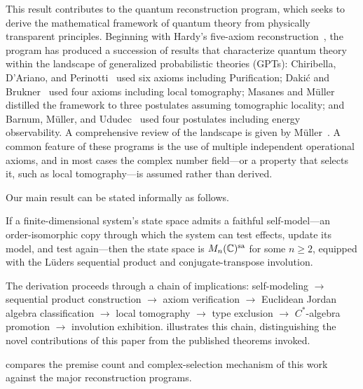 \documentclass[11pt]{article}
\begin{document}
This result contributes to the quantum reconstruction program, which
seeks to derive the mathematical framework of quantum theory from
physically transparent principles.  Beginning with Hardy's five-axiom
reconstruction~\cite{Hardy2001}, the program has produced a succession
of results that characterize quantum theory within the landscape of
generalized probabilistic theories (GPTs): Chiribella, D'Ariano, and
Perinotti~\cite{CDP2011} used six axioms including Purification;
Daki\'c and Brukner~\cite{DakicBrukner2011} used four axioms
including local tomography; Masanes and
M\"uller~\cite{MasanesMueller2011,MasanesMueller2013} distilled the
framework to three postulates assuming tomographic locality; and
Barnum, M\"uller, and
Ududec~\cite{BarnumMuellerUdudec2014} used four postulates including
energy observability.  A comprehensive review of the landscape is
given by M\"uller~\cite{Mueller2021}.  A common feature of these
programs is the use of multiple independent operational axioms, and in
most cases the complex number field---or a property that selects it,
such as local tomography---is assumed rather than derived.

Our main result can be stated informally as follows.

\begin{theorem}\label{thm:main-informal}
  If a finite-dimensional system's state space admits a faithful
  self-model---an order-isomorphic copy through which the system can
  test effects, update its model, and test again---then the state
  space is $M_{n}(\mathbb{C})^{\mathrm{sa}}$ for some $n \geq 2$, equipped with the
  L\"uders sequential product and conjugate-transpose involution.
\end{theorem}

The derivation proceeds through a chain of implications:
self-modeling $\to$ sequential product construction $\to$ axiom
verification $\to$ Euclidean Jordan algebra classification $\to$
local tomography $\to$ type exclusion $\to$ $C^{*}$-algebra promotion
$\to$ involution exhibition.
 illustrates this chain, distinguishing the novel
contributions of this paper from the published theorems invoked.

 compares the premise count and complex-selection
mechanism of this work against the major reconstruction programs.
\end{document}
